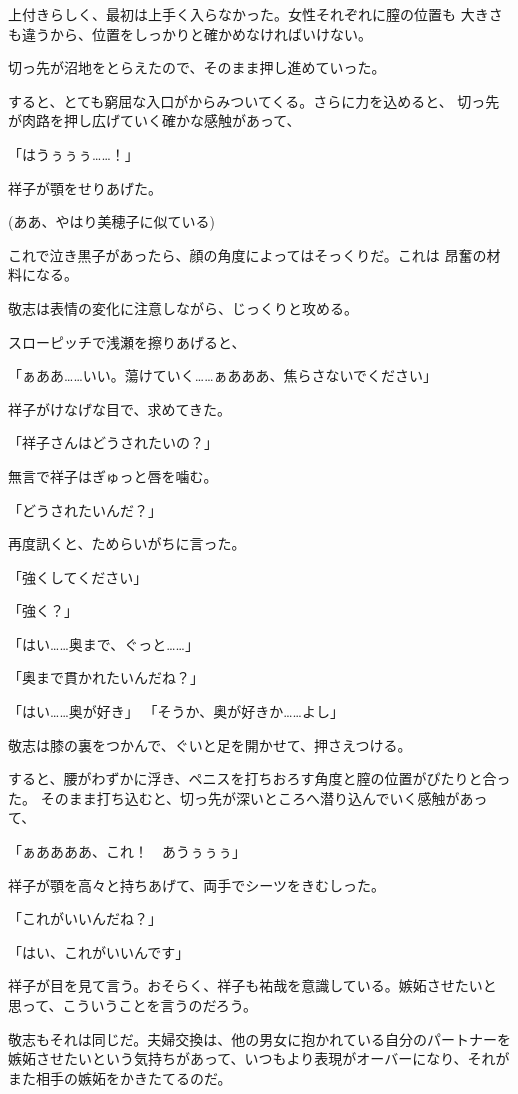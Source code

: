 ﻿\documentclass[
    book,tate,
    line_length=30zw,
    jafontsize=12pt,
    paper=b5j,
    landscape,
    ]{jlreq}
\begin{document}
上付きらしく、最初は上手く入らなかった。女性それぞれに膣の位置も
大きさも違うから、位置をしっかりと確かめなければいけない。

切っ先が沼地をとらえたので、そのまま押し進めていった。

すると、とても窮屈な入口がからみついてくる。さらに力を込めると、
切っ先が肉路を押し広げていく確かな感触があって、

「はうぅぅぅ……！」

祥子が顎をせりあげた。

(ああ、やはり美穂子に似ている)

これで泣き黒子があったら、顔の角度によってはそっくりだ。これは
昂奮の材料になる。

敬志は表情の変化に注意しながら、じっくりと攻める。

スローピッチで浅瀬を擦りあげると、

「ぁああ……いい。蕩けていく……ぁあああ、焦らさないでください」

祥子がけなげな目で、求めてきた。

「祥子さんはどうされたいの？」

無言で祥子はぎゅっと唇を噛む。

「どうされたいんだ？」

再度訊くと、ためらいがちに言った。

「強くしてください」

「強く？」

「はい……奥まで、ぐっと……」

「奥まで貫かれたいんだね？」

「はい……奥が好き」
「そうか、奥が好きか……よし」

敬志は膝の裏をつかんで、ぐいと足を開かせて、押さえつける。

すると、腰がわずかに浮き、ペニスを打ちおろす角度と膣の位置がぴたりと合った。
そのまま打ち込むと、切っ先が深いところへ潜り込んでいく感触があって、

「ぁああああ、これ！　あうぅぅぅ」

祥子が顎を高々と持ちあげて、両手でシーツをきむしった。

「これがいいんだね？」

「はい、これがいいんです」

祥子が目を見て言う。おそらく、祥子も祐哉を意識している。嫉妬させたいと
思って、こういうことを言うのだろう。

敬志もそれは同じだ。夫婦交換は、他の男女に抱かれている自分のパートナーを
嫉妬させたいという気持ちがあって、いつもより表現がオーバーになり、それが
また相手の嫉妬をかきたてるのだ。
\end{document}
